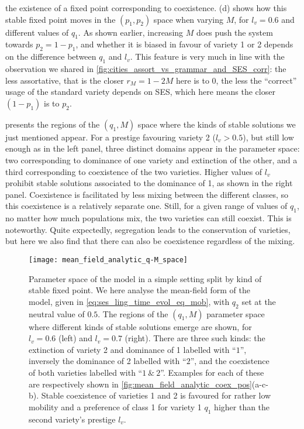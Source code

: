 \documentclass[../thesis.tex]{subfiles}
\begin{document}
the existence of a fixed point corresponding to coexistence.
(d) shows how this stable fixed point moves in
the $(p_1, p_2)$ space when varying $M$, for $l_v = 0.6$ and different values of $q_1$.
As shown earlier, increasing $M$ does push the system towards $p_2 = 1 - p_1$, and
whether it is biased in favour of variety 1 or 2 depends on the difference between $q_1$
and $l_v$. This feature is very much in line with the observation we shared in
\cref{fig:cities_assort_vs_grammar_and_SES_corr}: the less assortative, that is the
closer $r_M = 1 - 2 M$ here is to $0$, the less the ``correct'' usage of the standard
variety depends on \ac{SES}, which here means the closer $(1 - p_1)$ is to $p_2$.

 presents the regions of the $(q_1, M)$ space
where the kinds of stable solutions we just mentioned appear. For a prestige favouring
variety 2 ($l_v > 0.5$), but still low enough as in the left panel, three distinct
domains appear in the parameter space: two corresponding to dominance of one variety and
extinction of the other, and a third corresponding to coexistence of the two varieties.
Higher values of $l_v$ prohibit stable solutions associated to the dominance of 1, as
shown in the right panel. Coexistence is facilitated by less mixing between the
different classes, so this coexistence is a relatively separate one. Still, for a given
range of values of $q_1$, no matter how much populations mix, the two varieties can
still coexist. This is noteworthy. Quite expectedly, segregation leads to the
conservation of varieties, but here we also find that there can also be coexistence
regardless of the mixing.
\begin{figure}
  \centering
  \texttt{[image: mean\_field\_analytic\_q-M\_space]}
  \caption{Parameter space of the model in a simple setting split by kind of stable
  fixed point. We here analyse the mean-field form of the model, given in
  \cref{eq:ses_ling_time_evol_eq_mob}, with $q_2$ set at the neutral value of $0.5$. The
  regions of the $(q_1, M)$ parameter space where different kinds of stable solutions
  emerge are shown, for $l_v = 0.6$ (left) and $l_v = 0.7$ (right). There are three such
  kinds: the extinction of variety 2 and dominance of 1 labelled with ``$1$'', inversely
  the dominance of 2 labelled with ``$2$'', and the coexistence of both varieties
  labelled with ``$1~\&~2$''. Examples for each of these are respectively shown in
  \cref{fig:mean_field_analytic_coex_pos}(a-c-b). Stable coexistence of varieties 1 and
  2 is favoured for rather low mobility and a preference of class 1 for variety 1 $q_1$
  higher than the second variety's prestige $l_v$.}
  \label{fig:mean_field_analytic_q-M_space}
\end{figure}
\end{document}
